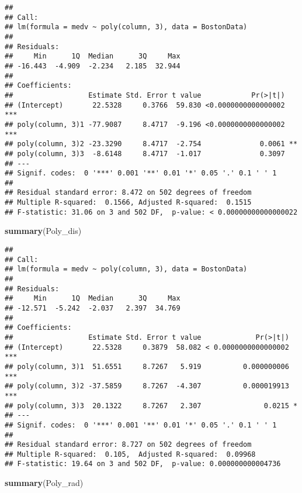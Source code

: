 \documentclass[]{article}
\newenvironment{Shaded}{\begin{snugshade}}{\end{snugshade}}
\newcommand{\KeywordTok}[1]{\textcolor[rgb]{0.13,0.29,0.53}{\textbf{#1}}}
\newcommand{\NormalTok}[1]{#1}
\begin{document}
\begin{verbatim}
## 
## Call:
## lm(formula = medv ~ poly(column, 3), data = BostonData)
## 
## Residuals:
##     Min      1Q  Median      3Q     Max 
## -16.443  -4.909  -2.234   2.185  32.944 
## 
## Coefficients:
##                  Estimate Std. Error t value            Pr(>|t|)    
## (Intercept)       22.5328     0.3766  59.830 <0.0000000000000002 ***
## poly(column, 3)1 -77.9087     8.4717  -9.196 <0.0000000000000002 ***
## poly(column, 3)2 -23.3290     8.4717  -2.754              0.0061 ** 
## poly(column, 3)3  -8.6148     8.4717  -1.017              0.3097    
## ---
## Signif. codes:  0 '***' 0.001 '**' 0.01 '*' 0.05 '.' 0.1 ' ' 1
## 
## Residual standard error: 8.472 on 502 degrees of freedom
## Multiple R-squared:  0.1566, Adjusted R-squared:  0.1515 
## F-statistic: 31.06 on 3 and 502 DF,  p-value: < 0.00000000000000022
\end{verbatim}

\begin{Shaded}
\begin{Highlighting}[]
\KeywordTok{summary}\NormalTok{(Poly_dis)}
\end{Highlighting}
\end{Shaded}

\begin{verbatim}
## 
## Call:
## lm(formula = medv ~ poly(column, 3), data = BostonData)
## 
## Residuals:
##     Min      1Q  Median      3Q     Max 
## -12.571  -5.242  -2.037   2.397  34.769 
## 
## Coefficients:
##                  Estimate Std. Error t value             Pr(>|t|)    
## (Intercept)       22.5328     0.3879  58.082 < 0.0000000000000002 ***
## poly(column, 3)1  51.6551     8.7267   5.919          0.000000006 ***
## poly(column, 3)2 -37.5859     8.7267  -4.307          0.000019913 ***
## poly(column, 3)3  20.1322     8.7267   2.307               0.0215 *  
## ---
## Signif. codes:  0 '***' 0.001 '**' 0.01 '*' 0.05 '.' 0.1 ' ' 1
## 
## Residual standard error: 8.727 on 502 degrees of freedom
## Multiple R-squared:  0.105,  Adjusted R-squared:  0.09968 
## F-statistic: 19.64 on 3 and 502 DF,  p-value: 0.000000000004736
\end{verbatim}

\begin{Shaded}
\begin{Highlighting}[]
\KeywordTok{summary}\NormalTok{(Poly_rad)}
\end{Highlighting}
\end{Shaded}
\end{document}
